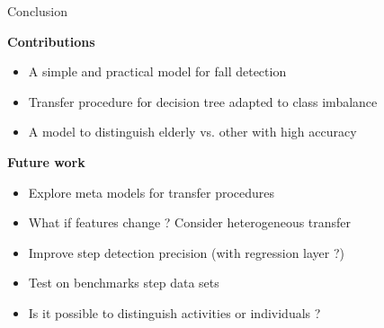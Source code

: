 \begin{frame}{Conclusion}

\centering
\begin{minipage}[t]{0.8\linewidth}
\centering
\textbf{Contributions}

\begin{itemize}
    \item A simple and practical model for fall detection
    \item Transfer procedure for decision tree adapted to class imbalance
    \item A model to distinguish elderly vs. other with high accuracy
\end{itemize}
\textbf{Future work}
\begin{itemize}
    \item Explore meta models for transfer procedures
    \item What if features change ? Consider heterogeneous transfer
    \item Improve step detection precision (with regression layer ?)
    \item Test on benchmarks step data sets
    \item Is it possible to distinguish activities or individuals ?
\end{itemize}
\end{minipage}

\vfill
\end{frame}
